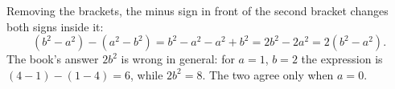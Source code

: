Removing the brackets, the minus sign in front of the second bracket changes both signs inside it:
\[
(b^2-a^2)-(a^2-b^2)=b^2-a^2-a^2+b^2=\boxed{2b^2-2a^2}=2(b^2-a^2).
\]
The book's answer $2b^2$ is wrong in general: for $a=1$, $b=2$ the expression is $(4-1)-(1-4)=6$, while $2b^2=8$. The two agree only when $a=0$.
